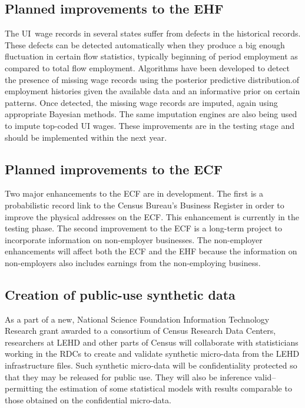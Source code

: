 \subsection{Planned improvements to the EHF}

The UI\ wage records in several states suffer from defects in the historical
records. These defects can be detected automatically when they produce a big
enough fluctuation in certain flow statistics, typically beginning of period
employment as compared to total flow employment. Algorithms have been
developed to detect the presence of missing wage records using the posterior
predictive distribution.of employment histories given the available data and
an informative prior on certain patterns. Once detected, the missing wage
records are imputed, again using appropriate Bayesian methods. The same
imputation engines are also being used to impute top-coded UI wages. These
improvements are in the testing stage and should be implemented within the
next year.

\subsection{Planned improvements to the ECF}

Two major enhancements to the ECF are in development. The first is a
probabilistic record link to the Census Bureau's Business Register in order
to improve the physical addresses on the ECF. This enhancement is currently
in the testing phase. The second improvement to the ECF is a long-term
project to incorporate information on non-employer businesses. The
non-employer enhancements will affect both the ECF and the EHF because the
information on non-employers also includes earnings from the non-employing
business.

\subsection{Creation of public-use synthetic data}

As a part of a new, National Science Foundation Information Technology
Research grant awarded to a consortium of Census Research Data Centers,
researchers at LEHD and other parts of Census will collaborate with
statisticians working in the RDCs to create and validate synthetic
micro-data from the LEHD infrastructure files. Such synthetic micro-data
will be confidentiality protected so that they may be released for public
use. They will also be inference valid--permitting the estimation of some
statistical models with results comparable to those obtained on the
confidential micro-data.

